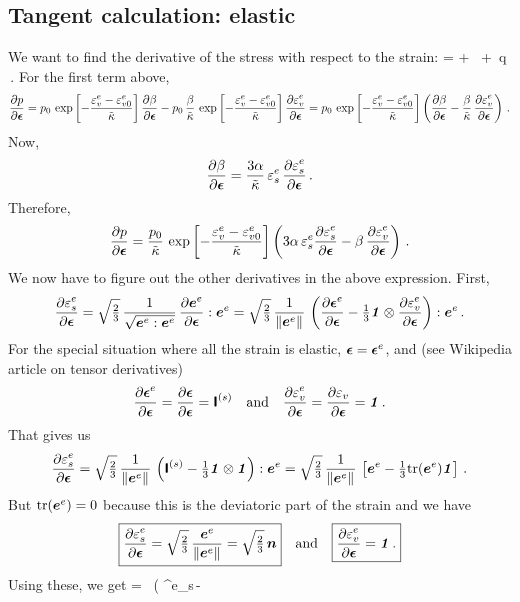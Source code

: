 \subsection{Tangent calculation: elastic}
We want to find the derivative of the stress with respect to the strain:
\Beq
   \Partial{\Bsig}{\Beps} = \Bone\otimes{} + 
      \,\BnT\otimes{} + 
      \,q\,\Partial{\BnT}{\Beps}  \,.
\Eeq
For the first term above,
\[
   \Partial{p}{\Beps} = p_0\,\exp\left[-\frac{\Ve^e_v - \Ve^e_{v0}}{\kappatilde}\right]\Partial{\beta}{\Beps}
      - p_0\,\frac{\beta}{\kappatilde}\,
        \exp\left[-\frac{\Ve^e_v - \Ve^e_{v0}}{\kappatilde}\right]\Partial{\Ve^e_v}{\Beps} 
     = p_0\,\exp\left[-\frac{\Ve^e_v - \Ve^e_{v0}}{\kappatilde}\right]\left(\Partial{\beta}{\Beps} -
            \frac{\beta}{\kappatilde}\,\Partial{\Ve^e_v}{\Beps} \right) \,.
\]
Now,
\[
   \Partial{\beta}{\Beps} = \frac{3\alpha}{\kappatilde}\,\Ve^e_s\,\Partial{\Ve^e_s}{\Beps} \,.
\]
Therefore, 
\[
  \Partial{p}{\Beps} = \frac{p_0}{\kappatilde}\,
      \exp\left[-\frac{\Ve^e_v - \Ve^e_{v0}}{\kappatilde}\right]\left(3\alpha\,\Ve^e_s\Partial{\Ve^e_s}{\Beps} -
            \beta\,\Partial{\Ve^e_v}{\Beps} \right) \,.
\]
We now have to figure out the other derivatives in the above expression.  First,
\[
  \Partial{\Ve^e_s}{\Beps} = \sqrt{\tfrac{2}{3}}\,\frac{1}{\sqrt{\BeT^e:\BeT^e}}\,\Partial{\BeT^e}{\Beps}:\BeT^e =
     \sqrt{\tfrac{2}{3}}\,\frac{1}{\Norm{\BeT^e}{}}\,
     \left(\Partial{\Beps^e}{\Beps} - \tfrac{1}{3}\Bone\otimes\Partial{\Ve^e_v}{\Beps} \right):\BeT^e\,.
\]
For the special situation where all the strain is elastic, $\Beps = \Beps^e$, and (see Wikipedia 
article on tensor derivatives)
\[
  \Partial{\Beps^e}{\Beps} = \Partial{\Beps}{\Beps} = \SfI^{(s)} \quad \Tand \quad
  \Partial{\Ve^e_v}{\Beps} = \Partial{\Ve_v}{\Beps} = \Bone \,.
\]
That gives us
\[
  \Partial{\Ve^e_s}{\Beps} = \sqrt{\tfrac{2}{3}}\,\frac{1}{\Norm{\BeT^e}{}}\,
     \left(\SfI^{(s)} - \tfrac{1}{3}\Bone\otimes\Bone \right):\BeT^e
   = \sqrt{\tfrac{2}{3}}\,\frac{1}{\Norm{\BeT^e}{}}\,
     \left[\BeT^e - \tfrac{1}{3}\Tr(\BeT^e)\Bone\right] \,.
\]
But $\Tr(\BeT^e)=0$ because this is the deviatoric part of the strain and we have
\[
  \boxed{
  \Partial{\Ve^e_s}{\Beps} = \sqrt{\tfrac{2}{3}}\,\frac{\BeT^e}{\Norm{\BeT^e}{}} = \sqrt{\tfrac{2}{3}}\,\BnT 
  }
  \quad \Tand \quad
  \boxed{
  \Partial{\Ve^e_v}{\Beps} = \Bone \,.
  }
\]
Using these, we get
\Beq
   = \,
      \exp{}\left(\,\alpha\,\Ve^e_s\,\BnT -
